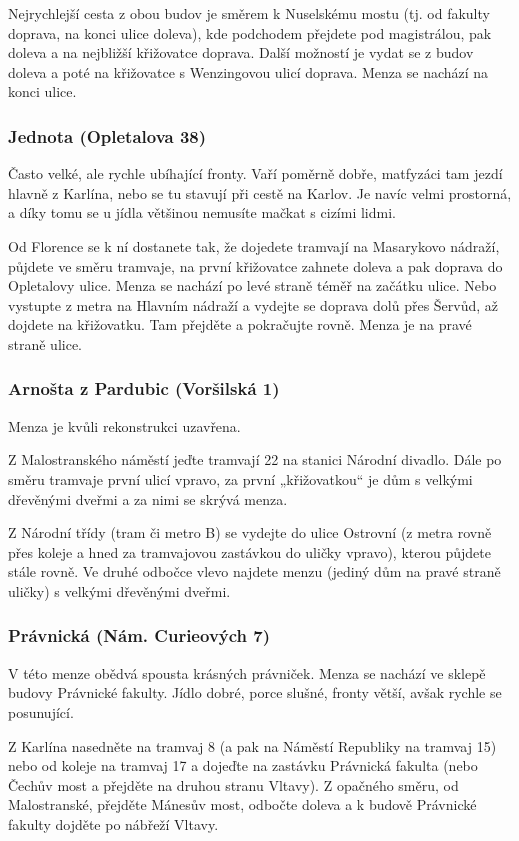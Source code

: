 Nejrychlejší cesta z obou budov je směrem k Nuselskému mostu (tj. od fakulty
doprava, na konci ulice doleva), kde podchodem přejdete pod magistrálou, pak
doleva a na nejbližší křižovatce doprava. Další možností je vydat se z budov
doleva a poté na křižovatce s Wenzingovou ulicí doprava. Menza se nachází na
konci ulice.


\subsubsection{Jednota (Opletalova 38)}
Často velké, ale rychle ubíhající fronty. Vaří poměrně dobře, matfyzáci tam
jezdí hlavně z Karlína, nebo se tu stavují při cestě na Karlov. Je navíc velmi
prostorná, a díky tomu se u jídla většinou nemusíte mačkat s cizími lidmi.

Od Florence se k ní dostanete tak, že dojedete tramvají na Masarykovo nádraží,
půjdete ve směru tramvaje, na první křižovatce zahnete doleva a pak doprava do
Opletalovy ulice. Menza se nachází po levé straně téměř na začátku ulice. Nebo
vystupte z metra na Hlavním nádraží a vydejte se doprava dolů přes Šervůd, až
dojdete na křižovatku. Tam přejděte a pokračujte rovně. Menza je na pravé straně
ulice.


\subsubsection{Arnošta z Pardubic (Voršilská 1)}
Menza je kvůli rekonstrukci uzavřena.

Z Malostranského náměstí jeďte tramvají 22 na stanici Národní divadlo. Dále po
směru tramvaje první ulicí vpravo, za první „křižovatkou“ je dům s velkými
dřevěnými dveřmi a za nimi se skrývá menza.

Z Národní třídy (tram či metro B) se vydejte do ulice Ostrovní (z metra rovně
přes koleje a hned za tramvajovou zastávkou do uličky vpravo), kterou půjdete
stále rovně. Ve druhé odbočce vlevo najdete menzu (jediný dům na pravé straně
uličky) s velkými dřevěnými dveřmi.


\subsubsection{Právnická (Nám. Curieových 7)}
V této menze obědvá spousta krásných právniček. Menza se nachází ve sklepě
budovy Právnické fakulty. Jídlo dobré, porce slušné, fronty větší, avšak rychle
se posunující.

Z Karlína nasedněte na tramvaj 8 (a pak na Náměstí Republiky na tramvaj 15) nebo
od koleje na tramvaj 17 a dojeďte na zastávku Právnická fakulta (nebo Čechův
most a přejděte na druhou stranu Vltavy). Z opačného směru, od Malostranské,
přejděte Mánesův most, odbočte doleva a k budově Právnické fakulty dojděte po
nábřeží Vltavy.

